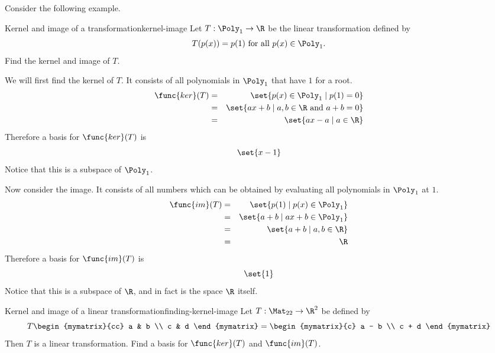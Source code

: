 Consider the following example.

\begin{example}{Kernel and image of a transformation}{kernel-image}
Let $T:\Poly_1\to\R$ be the linear transformation defined by
\[ T(p(x))=p(1)\mbox{ for all } p(x)\in \Poly_1.\]
Find the kernel and image of $T$.
\end{example}

\begin{solution}
We will first find the kernel of $T$. It consists of all polynomials in $\Poly_1$ that have $1$ for a root.
\begin{eqnarray*}
\func{ker}(T) & = & \set{p(x)\in \Poly_1 \mid p(1)=0} \\
& = & \set{ax+b \mid a,b\in\R \mbox{ and }a+b=0} \\
& = & \set{ax-a \mid a\in\R}
\end{eqnarray*}
Therefore a basis for $\func{ker}(T)$ is
\[
\set{x-1 }
\]
Notice that this is a subspace of $\Poly_1$.

Now consider the image. It consists of all numbers which can be obtained by evaluating all polynomials in $\Poly_1$ at $1$.
\begin{eqnarray*}
\func{im}(T) & = & \set{p(1) \mid p(x)\in \Poly_1} \\
 & = & \set{a+b \mid ax+b\in \Poly_1} \\
 & = & \set{a+b \mid a,b\in\R}\\
 & = & \R
\end{eqnarray*}
Therefore a basis for $\func{im}(T)$ is
\[
\set{1 }
\]
Notice that this is a subspace of $\R$, and in fact is the space $\R$ itself.
\end{solution}

\begin{example}{Kernel and image of a linear transformation}{finding-kernel-image}
Let $T: \Mat_{22} \to \R^2$ be defined by
\[
T \begin{mymatrix}{cc}
a & b \\
c & d
\end{mymatrix}
 =
\begin{mymatrix}{c}
a - b \\
c + d
\end{mymatrix}
\]
Then $T$ is a linear transformation. Find a basis for $\func{ker} (T)$ and $\func{im}(T)$.
\end{example}

